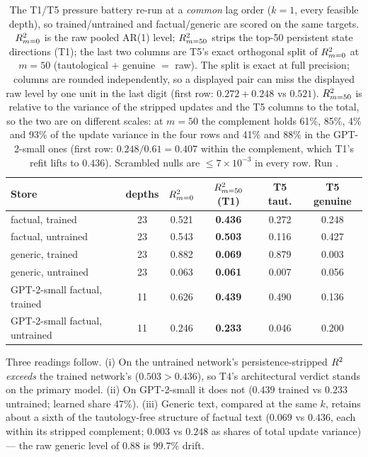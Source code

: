 \begin{table}[t]
  \centering
  \small
  \caption{The T1/T5 pressure battery re-run at a \emph{common} lag order
  ($k{=}1$, every feasible depth), so trained/untrained and factual/generic are
  scored on the same targets. $R^2_{m=0}$ is the raw pooled AR(1) level;
  $R^2_{m=50}$ strips the top-50 persistent state directions (T1); the last two
  columns are T5's exact orthogonal split of $R^2_{m=0}$ at $m{=}50$
  (tautological $+$ genuine $=$ raw). The split is exact at full precision;
  columns are rounded independently, so a displayed pair can miss the
  displayed raw level by one unit in the last digit (first row:
  $0.272 + 0.248$ vs $0.521$). $R^2_{m=50}$ is relative to the variance of
  the stripped updates and the T5 columns to the total, so the two are on
  different scales: at $m{=}50$ the complement holds 61\%, 85\%, 4\% and
  93\% of the update variance in the four \pythia{} rows and 41\% and 88\%
  in the GPT-2-small ones (first row: $0.248 / 0.61 = 0.407$ within the
  complement, which T1's refit lifts to $0.436$). Scrambled nulls are
  $\le 7\times10^{-3}$ in every row. Run .}
  \label{tab:commondepth}
  \begin{tabular}{lccccc}
    \toprule
    Store & depths & $R^2_{m=0}$ & $R^2_{m=50}$ (T1) &
    T5 taut. & T5 genuine \\
    \midrule
    \pythia{} factual, trained    & 23 & 0.521 & \textbf{0.436} & 0.272 & 0.248 \\
    \pythia{} factual, untrained  & 23 & 0.543 & \textbf{0.503} & 0.116 & 0.427 \\
    \pythia{} generic, trained    & 23 & 0.882 & \textbf{0.069} & 0.879 & 0.003 \\
    \pythia{} generic, untrained  & 23 & 0.063 & \textbf{0.061} & 0.007 & 0.056 \\
    GPT-2-small factual, trained   & 11 & 0.626 & \textbf{0.439} & 0.490 & 0.136 \\
    GPT-2-small factual, untrained & 11 & 0.246 & \textbf{0.233} & 0.046 & 0.200 \\
    \bottomrule
  \end{tabular}
\end{table}

\noindent Three readings follow. (i) On \pythia{} the untrained network's
persistence-stripped $R^2$ \emph{exceeds} the trained network's
($0.503 > 0.436$), so T4's architectural verdict stands on the primary model.
(ii) On GPT-2-small it does not ($0.439$ trained vs $0.233$ untrained; learned
share $47\%$). (iii) Generic text, compared at the same $k$, retains about a
sixth of the tautology-free structure of factual text ($0.069$ vs
$0.436$, each within its stripped complement; $0.003$ vs $0.248$ as shares
of total update variance) --- the raw generic level of $0.88$ is $99.7\%$
drift.

